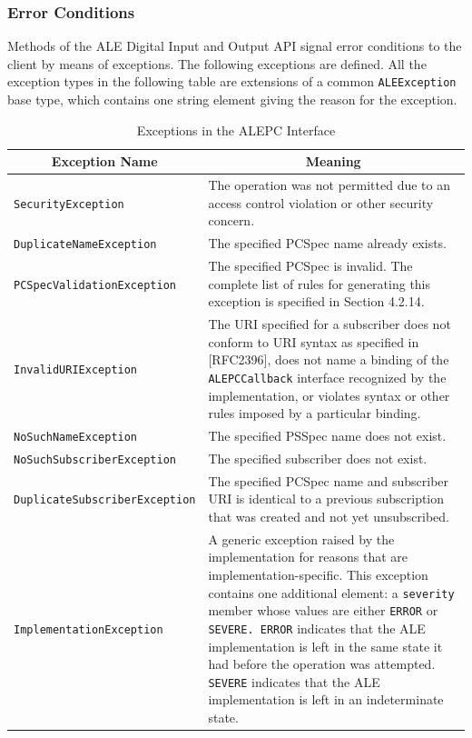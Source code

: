 \documentclass[11pt,a4paper,oneside]{article}
\begin{document}
\subsubsection{Error Conditions}
Methods of the ALE Digital Input and Output API signal error conditions to the client by means of exceptions. The following exceptions are defined. All the exception types in the following table are extensions of a common \texttt{ALEException} base type, which contains one string element giving the reason for the exception.

\begin{table}[!h]
\begin{tabular}{ 
|p{}%
|p{}|%
}
\hline
\multicolumn{1}{|c|}{\textbf{Exception Name}}&\multicolumn{1}{c|}{\textbf{Meaning}}\\
\hline
\texttt{SecurityException}&The operation was not permitted due to an access control violation or other security concern. \\
\hline
\texttt{DuplicateNameException}&The specified PCSpec name already exists. \\
\hline
\texttt{PCSpecValidationException}&The specified PCSpec is invalid. The complete list of rules for generating this exception is specified in Section 4.2.14.\\
\hline
\texttt{InvalidURIException}&The URI specified for a subscriber does not conform to URI syntax as specified in [RFC2396], does not name a binding of the \texttt{ALEPCCallback} interface recognized by the implementation, or violates syntax or other rules imposed by a particular binding.\\
\hline
\texttt{NoSuchNameException}&The specified PSSpec name does not exist.\\
\hline
\texttt{NoSuchSubscriberException}&The specified subscriber does not exist.\\
\hline
\texttt{DuplicateSubscriber\newline Exception}&The specified PCSpec name and subscriber URI is identical to a previous subscription that was created and not yet unsubscribed.\\
\hline
\texttt{ImplementationException}&A generic exception raised by the implementation for reasons that are implementation-specific. This exception contains one additional element: a \texttt{severity} member whose values are either \texttt{ERROR} or \texttt{SEVERE. ERROR} indicates that the ALE implementation is left in the same state it had before the operation was attempted. \texttt{SEVERE} indicates that the ALE implementation is left in an indeterminate state.\\
\hline
\end{tabular}
\caption{Exceptions in the ALEPC Interface}
\MakeLineNo
\end{table}
\FloatBarrier
\end{document}
